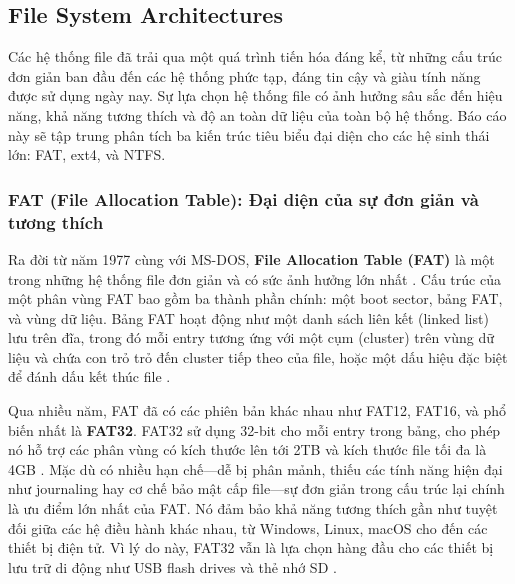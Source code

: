 \documentclass[12pt]{article}
\begin{document}


\subsection{File System Architectures}

Các hệ thống file đã trải qua một quá trình tiến hóa đáng kể, từ những cấu trúc đơn giản ban đầu đến các hệ thống phức tạp, đáng tin cậy và giàu tính năng được sử dụng ngày nay. Sự lựa chọn hệ thống file có ảnh hưởng sâu sắc đến hiệu năng, khả năng tương thích và độ an toàn dữ liệu của toàn bộ hệ thống. Báo cáo này sẽ tập trung phân tích ba kiến trúc tiêu biểu đại diện cho các hệ sinh thái lớn: FAT, ext4, và NTFS.

\subsubsection{FAT (File Allocation Table): Đại diện của sự đơn giản và tương thích}
Ra đời từ năm 1977 cùng với MS-DOS, \textbf{File Allocation Table (FAT)} là một trong những hệ thống file đơn giản và có sức ảnh hưởng lớn nhất \parencite{Bundele2018}. Cấu trúc của một phân vùng FAT bao gồm ba thành phần chính: một boot sector, bảng FAT, và vùng dữ liệu. Bảng FAT hoạt động như một danh sách liên kết (linked list) lưu trên đĩa, trong đó mỗi entry tương ứng với một cụm (cluster) trên vùng dữ liệu và chứa con trỏ trỏ đến cluster tiếp theo của file, hoặc một dấu hiệu đặc biệt để đánh dấu kết thúc file \parencite{Tanenbaum2014}.

Qua nhiều năm, FAT đã có các phiên bản khác nhau như FAT12, FAT16, và phổ biến nhất là \textbf{FAT32}. FAT32 sử dụng 32-bit cho mỗi entry trong bảng, cho phép nó hỗ trợ các phân vùng có kích thước lên tới 2TB và kích thước file tối đa là 4GB \parencite{Bundele2018}. Mặc dù có nhiều hạn chế—dễ bị phân mảnh, thiếu các tính năng hiện đại như journaling hay cơ chế bảo mật cấp file—sự đơn giản trong cấu trúc lại chính là ưu điểm lớn nhất của FAT. Nó đảm bảo khả năng tương thích gần như tuyệt đối giữa các hệ điều hành khác nhau, từ Windows, Linux, macOS cho đến các thiết bị điện tử. Vì lý do này, FAT32 vẫn là lựa chọn hàng đầu cho các thiết bị lưu trữ di động như USB flash drives và thẻ nhớ SD \parencite{Dhjaku2019}.
\end{document}
